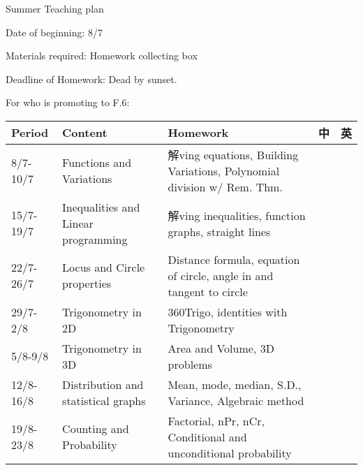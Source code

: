 \documentclass{article}
\begin{document}
    \begin{center}
        Summer Teaching plan
    \end{center}

    Date of beginning: 8/7

    Materials required: Homework collecting box
    
    Deadline of Homework: Dead by sunset.

    For who is promoting to F.6:
    \begin{center}
        \begin{tabular}{|m{2cm}|m{6cm}|m{6cm}|m{1cm}|m{1cm}|}
            \hline
            Period&Content&Homework&中&英\\
            \hline
            8/7-10/7&Functions and Variations&解ving equations, Building Variations, Polynomial division w/ Rem. Thm.&&\\
            \hline
            15/7-19/7&Inequalities and Linear programming&解ving inequalities, function graphs, straight lines&&\\
            \hline
            22/7-26/7&Locus and Circle properties&Distance formula, equation of circle, angle in and tangent to circle&&\\
            \hline
            29/7-2/8&Trigonometry in 2D&360Trigo, identities with Trigonometry&&\\
            \hline
            5/8-9/8&Trigonometry in 3D&Area and Volume, 3D problems&&\\
            \hline
            12/8-16/8&Distribution and statistical graphs&Mean, mode, median, S.D., Variance, Algebraic method&&\\
            \hline
            19/8-23/8&Counting and Probability& Factorial, nPr, nCr, Conditional and unconditional probability&&\\
            \hline
        \end{tabular}
    \end{center}
\end{document}
